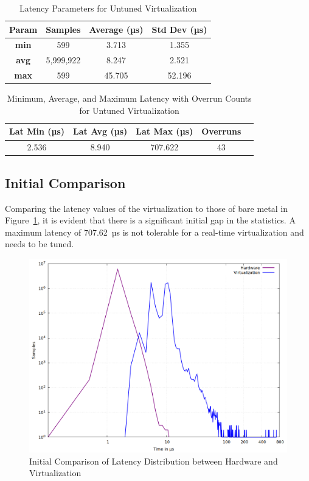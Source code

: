 \documentclass[MMR,Master,english]{style/twbook}
\begin{document}
\begin{table}[H]
	\centering
	\caption{Latency Parameters for Untuned Virtualization}
	\label{tab:latency_stats_virt}
	\begin{tabular}{|c|c|c|c|}
		\hline
		\textbf{Param} & \textbf{Samples} & \textbf{Average (µs)} & \textbf{Std Dev (µs)} \\ \hline
		\textbf{min}   & 599              & 3.713                 & 1.355                 \\ \hline
		\textbf{avg}   & 5,999,922        & 8.247                 & 2.521                 \\ \hline
		\textbf{max}   & 599              & 45.705                & 52.196                \\ \hline
	\end{tabular}
\end{table}

\begin{table}[H]
	\centering
	\caption[Latency Statistics with Overrun Counts for Untuned Virtualization]{Minimum, Average, and Maximum Latency with Overrun Counts for Untuned Virtualization}
	\label{tab:latency_overrun_msw_new_virt}
	\begin{tabular}{|c|c|c|c|c|}
		\hline
		\textbf{Lat Min (µs)} & \textbf{Lat Avg (µs)} & \textbf{Lat Max (µs)} & \textbf{Overruns} \\ \hline
		2.536                 & 8.940                 & 707.622               & 43                \\ \hline
	\end{tabular}
\end{table}

\subsection{Initial Comparison}
\noindent Comparing the latency values of the virtualization to those of bare metal in Figure~\ref{fig:gnuplot_max_latency_combined}, it is evident that there is a significant initial gap in the statistics. A maximum latency of 707.62~µs is not tolerable for a real-time virtualization and needs to be tuned.

\begin{figure}[H]
	\centering
	\includegraphics[width=0.7\columnwidth]{img/implementation/gnuplot_combined_max_latency.png}
	\caption[Initial Comparison of Latency Distribution between Hardware and Virtualization]{Initial Comparison of Latency Distribution between Hardware and Virtualization}
	\label{fig:gnuplot_max_latency_combined}
\end{figure}
\end{document}
